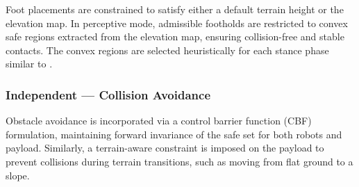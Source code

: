 
Foot placements are constrained to satisfy either a default terrain height or the elevation map. In perceptive mode, admissible footholds are restricted to convex safe regions extracted from the elevation map, ensuring collision-free and stable contacts. The convex regions are selected heuristically for each stance phase similar to \cite{grandia2023perceptive}.


\subsubsection{Independent --- \textbf{Collision Avoidance}}
Obstacle avoidance is incorporated via a control barrier function (CBF) formulation, maintaining forward invariance of the safe set for both robots and payload.
Similarly, a terrain-aware constraint is imposed on the payload to prevent collisions during terrain transitions, such as moving from flat ground to a slope.

